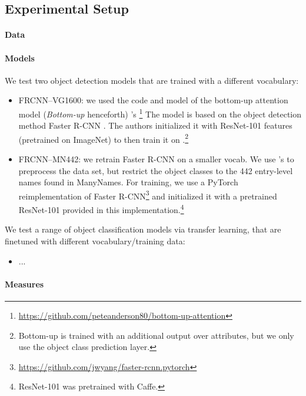 \subsection{Experimental Setup}
\label{sect:exp_setup}

\paragraph{Data}

\paragraph{Models}
We test two object detection models that are trained with a different vocabulary:

\begin{itemize}
	\item FRCNN--VG1600: we used the code and model of the bottom-up attention model (\textit{Bottom-up} henceforth)  \citeauthor{anderson2018updown}'s \citeyear{anderson2018updown} \footnote{\url{https://github.com/peteanderson80/bottom-up-attention}} The model is based on the object detection method Faster R-CNN \cite{fasterrcnn2015}. The authors initialized it with ResNet-101 \cite{he2016deep} features (pretrained on ImageNet) to then train it on \vg.\footnote{Bottom-up is trained with an additional output over attributes, but we only use the object class prediction layer.} 
	
	\item FRCNN--MN442: we retrain Faster R-CNN \cite{fasterrcnn2015} on a smaller vocab. We use \citeauthor{anderson2018updown}'s to preprocess the data set, but restrict the object classes to the 442 entry-level names found in ManyNames. For training, we use a PyTorch reimplementation of Faster R-CNN\footnote{\url{https://github.com/jwyang/faster-rcnn.pytorch}} and initialized it with a pretrained ResNet-101 provided in this implementation.\footnote{ResNet-101 was pretrained with Caffe.}
\end{itemize}

We test a range of object classification models via transfer learning, that are finetuned with different vocabulary/training data:

\begin{itemize}
	\item ...
\end{itemize}

\paragraph{Measures}


